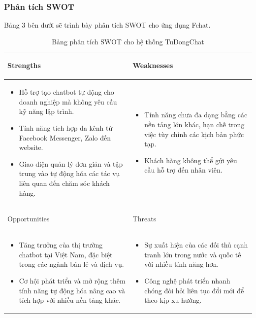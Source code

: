 \subsubsection{Phân tích SWOT}
Bảng 3 bên dưới sẽ trình bày phân tích SWOT cho ứng dụng Fchat.
\begin{table}[H]
\centering
\begin{tabular}{|p{7cm}|p{7cm}|}
\hline
\begin{center}
    Strengths
\end{center}
  &  \begin{center}
      Weaknesses
  \end{center} \\
\hline
\begin{itemize}
    \item Hỗ trợ tạo chatbot tự động cho doanh nghiệp mà không yêu cầu kỹ năng lập trình.
\item Tính năng tích hợp đa kênh từ Facebook Messenger, Zalo đến website.
\item Giao diện quản lý đơn giản và tập trung vào tự động hóa các tác vụ liên quan đến chăm sóc khách hàng.

\end{itemize} &  
\begin{itemize}
    \item Tính năng chưa đa dạng bằng các nền tảng lớn khác, hạn chế trong việc tùy chỉnh các kịch bản phức tạp.
\item Khách hàng không thể gửi yêu cầu hỗ trợ đến nhân viên.
\end{itemize}\\
\hline
\begin{center}
    Opportunities
\end{center} & \begin{center}
    Threats
\end{center}\\
\hline
\begin{itemize}
    \item Tăng trưởng của thị trường chatbot tại Việt Nam, đặc biệt trong các ngành bán lẻ và dịch vụ.
\item Cơ hội phát triển và mở rộng thêm tính năng tự động hóa nâng cao và tích hợp với nhiều nền tảng khác.
\end{itemize} &  
\begin{itemize}
    \item Sự xuất hiện của các đối thủ cạnh tranh lớn trong nước và quốc tế với nhiều tính năng hơn.
\item Công nghệ phát triển nhanh chóng đòi hỏi liên tục đổi mới để theo kịp xu hướng.
\end{itemize}\\
\hline
\end{tabular}
\caption{Bảng phân tích SWOT cho hệ thống TuDongChat}
\end{table}